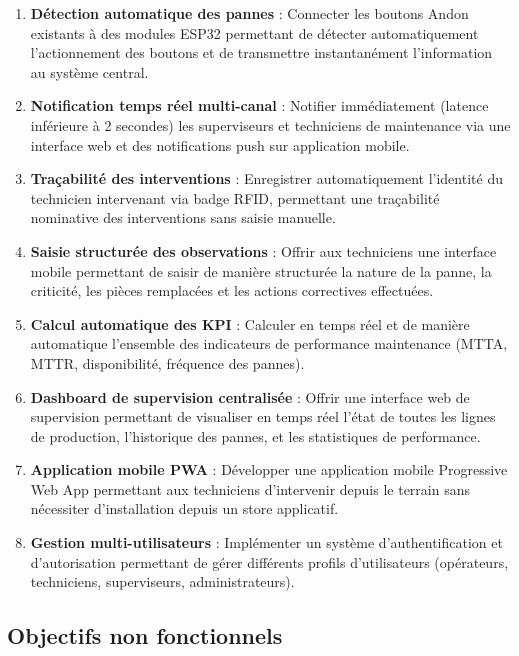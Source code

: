 \begin{enumerate}
    \item \textbf{Détection automatique des pannes} : Connecter les boutons Andon existants à des modules ESP32 permettant de détecter automatiquement l'actionnement des boutons et de transmettre instantanément l'information au système central.
    
    \item \textbf{Notification temps réel multi-canal} : Notifier immédiatement (latence inférieure à 2 secondes) les superviseurs et techniciens de maintenance via une interface web et des notifications push sur application mobile.
    
    \item \textbf{Traçabilité des interventions} : Enregistrer automatiquement l'identité du technicien intervenant via badge RFID, permettant une traçabilité nominative des interventions sans saisie manuelle.
    
    \item \textbf{Saisie structurée des observations} : Offrir aux techniciens une interface mobile permettant de saisir de manière structurée la nature de la panne, la criticité, les pièces remplacées et les actions correctives effectuées.
    
    \item \textbf{Calcul automatique des KPI} : Calculer en temps réel et de manière automatique l'ensemble des indicateurs de performance maintenance (MTTA, MTTR, disponibilité, fréquence des pannes).
    
    \item \textbf{Dashboard de supervision centralisée} : Offrir une interface web de supervision permettant de visualiser en temps réel l'état de toutes les lignes de production, l'historique des pannes, et les statistiques de performance.
    
    \item \textbf{Application mobile PWA} : Développer une application mobile Progressive Web App permettant aux techniciens d'intervenir depuis le terrain sans nécessiter d'installation depuis un store applicatif.
    
    \item \textbf{Gestion multi-utilisateurs} : Implémenter un système d'authentification et d'autorisation permettant de gérer différents profils d'utilisateurs (opérateurs, techniciens, superviseurs, administrateurs).
\end{enumerate}


\subsection{Objectifs non fonctionnels}

